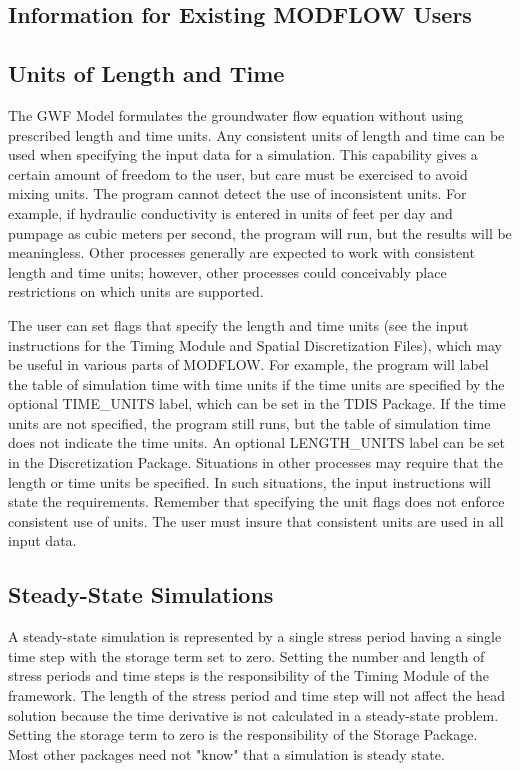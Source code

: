 \subsection{Information for Existing MODFLOW Users}




\subsection{Units of Length and Time}
The GWF Model formulates the groundwater flow equation without using prescribed length and time units. Any consistent units of length and time can be used when specifying the input data for a simulation. This capability gives a certain amount of freedom to the user, but care must be exercised to avoid mixing units.  The program cannot detect the use of inconsistent units.  For example, if hydraulic conductivity is entered in units of feet per day and pumpage as cubic meters per second, the program will run, but the results will be meaningless. Other processes generally are expected to work with consistent length and time units; however, other processes could conceivably place restrictions on which units are supported.

The user can set flags that specify the length and time units (see the input instructions for the Timing Module and Spatial Discretization Files), which may be useful in various parts of MODFLOW.  For example, the program will label the table of simulation time with time units if the time units are specified by the optional TIME\_UNITS label, which can be set in the TDIS Package.  If the time units are not specified, the program still runs, but the table of simulation time does not indicate the time units. An optional LENGTH\_UNITS label can be set in the Discretization Package. Situations in other processes may require that the length or time units be specified.  In such situations, the input instructions will state the requirements. Remember that specifying the unit flags does not enforce consistent use of units.  The user must insure that consistent units are used in all input data.

\subsection{Steady-State Simulations}
A steady-state simulation is represented by a single stress period having a single time step with the storage term set to zero. Setting the number and length of stress periods and time steps is the responsibility of the Timing Module of the \mf framework. The length of the stress period and time step will not affect the head solution because the time derivative is not calculated in a steady-state problem. Setting the storage term to zero is the responsibility of the Storage Package. Most other packages need not "know" that a simulation is steady state.

